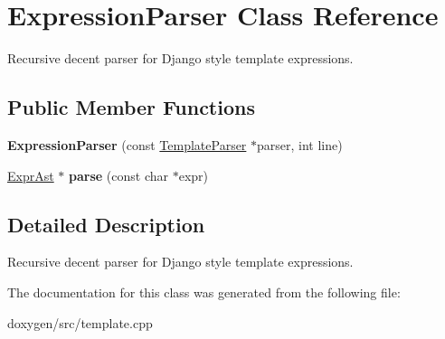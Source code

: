\hypertarget{class_expression_parser}{}\section{Expression\+Parser Class Reference}
\label{class_expression_parser}


Recursive decent parser for Django style template expressions.  


\subsection*{Public Member Functions}
\begin{DoxyCompactItemize}
\item 
\mbox{\label{class_expression_parser_ab0d2fb617ff67948408d41eee1366181}} 
{\bfseries Expression\+Parser} (const \mbox{\hyperlink{class_template_parser}{Template\+Parser}} $\ast$parser, int line)
\item 
\mbox{\label{class_expression_parser_a7d8fb48c532a03f9cf2e30d749c2844f}} 
\mbox{\hyperlink{class_expr_ast}{Expr\+Ast}} $\ast$ {\bfseries parse} (const char $\ast$expr)
\end{DoxyCompactItemize}


\subsection{Detailed Description}
Recursive decent parser for Django style template expressions. 

The documentation for this class was generated from the following file\+:\begin{DoxyCompactItemize}
\item 
doxygen/src/template.\+cpp\end{DoxyCompactItemize}
